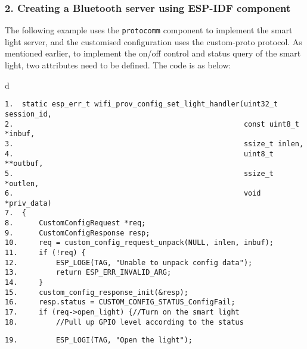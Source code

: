 \documentclass[a4paper,12pt]{book}
\begin{document}
\subsubsection{2. Creating a Bluetooth server using ESP-IDF component}

The following example uses the \verb|protocomm| component to implement the smart light server, and the customised configuration uses the custom-proto protocol. As mentioned earlier, to implement the on/off control and status query of the smart light, two attributes need to be defined. The code is as below:

\begin{codebloc}
\begin{tabular}{d}
\vspace{2pt}
\begin{verbatim}
1.  static esp_err_t wifi_prov_config_set_light_handler(uint32_t session_id,
2.                                                      const uint8_t *inbuf,
3.                                                      ssize_t inlen,
4.                                                      uint8_t **outbuf,
5.                                                      ssize_t *outlen,
6.                                                      void *priv_data)
7.  {
8.      CustomConfigRequest *req;
9.      CustomConfigResponse resp;
10.     req = custom_config_request_unpack(NULL, inlen, inbuf);
11.     if (!req) {
12.         ESP_LOGE(TAG, "Unable to unpack config data");
13.         return ESP_ERR_INVALID_ARG;
14.     }
15.     custom_config_response_init(&resp);
16.     resp.status = CUSTOM_CONFIG_STATUS_ConfigFail;
17.     if (req->open_light) {//Turn on the smart light
18.         //Pull up GPIO level according to the status
\end{verbatim}
\verb|19.         ESP_LOGI(TAG, "Open the light");|
\end{tabular}
\end{codebloc}
\end{document}
